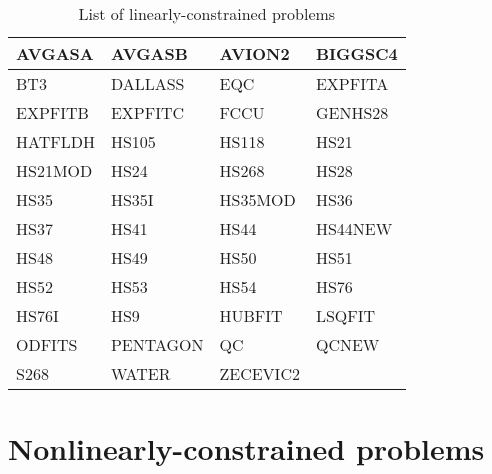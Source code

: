 \begin{longtable}{llll}
    \caption{List of linearly-constrained problems}\\
    \toprule
    AVGASA  & AVGASB    & AVION2    & BIGGSC4\\
    \midrule
    BT3     & DALLASS   & EQC       & EXPFITA\\
    \midrule
    EXPFITB & EXPFITC   & FCCU      & GENHS28\\
    \midrule
    HATFLDH & HS105     & HS118     & HS21\\
    \midrule
    HS21MOD & HS24      & HS268     & HS28\\
    \midrule
    HS35    & HS35I     & HS35MOD   & HS36\\
    \midrule
    HS37    & HS41      & HS44      & HS44NEW\\
    \midrule
    HS48    & HS49      & HS50      & HS51\\
    \midrule
    HS52    & HS53      & HS54      & HS76\\
    \midrule
    HS76I   & HS9       & HUBFIT    & LSQFIT\\
    \midrule
    ODFITS  & PENTAGON  & QC        & QCNEW\\
    \midrule
    S268    & WATER     & ZECEVIC2\\
    \bottomrule
\end{longtable}

\section{Nonlinearly-constrained problems}
\label{sec:list-nonlinearly-constrained-problems}

